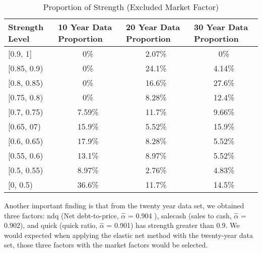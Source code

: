\begin{table}[hb]
	\caption{Proportion of Strength (Excluded Market Factor) }\label{table:proportion}
	\begin{tabular}{lccc}
		\hline
		\hline
		Strength Level & \multicolumn{1}{l}{10 Year Data Proportion} & \multicolumn{1}{l}{20 Year Data Proportion} & \multicolumn{1}{l}{30 Year Data Proportion} \\ \hline
		{[}0.9, 1{]}   & 0\%                                         & 2.07\%                                      & 0\%                                         \\
		{[}0.85, 0.9)  & 0\%                                         & 24.1\%                                      & 4.14\%                                      \\
		{[}0.8, 0.85)  & 0\%                                         & 16.6\%                                      & 27.6\%                                      \\
		{[}0.75, 0.8)  & 0\%                                         & 8.28\%                                      & 12.4\%                                      \\
		{[}0.7, 0.75)  & 7.59\%                                      & 11.7\%                                      & 9.66\%                                      \\
		{[}0.65, 07)   & 15.9\%                                      & 5.52\%                                      & 15.9\%                                      \\
		{[}0.6, 0.65)  & 17.9\%                                      & 8.28\%                                      & 5.52\%                                      \\
		{[}0.55, 0.6)  & 13.1\%                                      & 8.97\%                                      & 5.52\%                                      \\
		{[}0.5, 0.55)  & 8.97\%                                      & 2.76\%                                      & 4.83\%                                      \\
		{[}0, 0.5)     & 36.6\%                                      & 11.7\%                                      & 14.5\%                                      \\ \hline\hline
	\end{tabular}
\end{table}
Another important finding is that from the twenty year data set, we obtained three factors: ndq (Net debt-to-price, $\hat{\alpha}$ = 0.904 ), salecash (sales to cash, $\hat{\alpha}$ = 0.902), and quick (quick ratio, $\hat{\alpha}$ = 0.901) has strength greater than 0.9.
We would expected when applying the elastic net method with the twenty-year data set, those three factors with the market factors would be selected.

